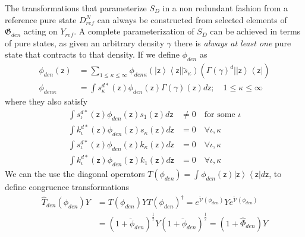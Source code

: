 \documentclass[aps,preprint]{revtex4}%
\begin{document}
The transformations that parameterize $S_{D}$ in a non redundant fashion from
a reference pure state $D_{ref}^{N}$ can always be constructed from selected
elements of $\mathfrak{G}_{den}$ acting on $Y_{ref}$. A complete
parameterization of $S_{D}$ can be achieved in terms of pure states, as given
an arbitrary density $\gamma$ there is \emph{always at least one} pure state
that contracts to that density. If we define $\phi_{den}$ as
\begin{align}
\phi_{den}\left(  \mathsf{z}\right)   &  =\sum_{1\leq\kappa\leq\infty}%
\phi_{den\kappa}\left(  \left|  \mathsf{z}\right\rangle \left\langle
\mathsf{z}\right|  |\breve{s}_{\kappa}\right)  \left(  \Gamma\left(
\gamma\right)  ^{d}|\left|  \mathsf{z}\right\rangle \left\langle
\mathsf{z}\right|  \right) \nonumber\\
\phi_{den\kappa}  &  =\int s_{\kappa}^{d\ast}\left(  \mathsf{z}\right)
\phi_{den}\left(  \mathsf{z}\right)  \Gamma\left(  \gamma\right)  \left(
\mathsf{z}\right)  d\mathsf{z};\quad1\leq\kappa\leq\infty
\end{align}
where they also satisfy
\begin{align}
\int s_{\iota}^{d\ast}\left(  \mathsf{z}\right)  \phi_{den}\left(
\mathsf{z}\right)  s_{1}\left(  \mathsf{z}\right)  d\mathsf{z}  &  \neq
0\quad\text{for some }\iota\nonumber\\
\int k_{\iota}^{d\ast}\left(  \mathsf{z}\right)  \phi_{den}\left(
\mathsf{z}\right)  s_{\kappa}\left(  \mathsf{z}\right)  d\mathsf{z}  &
=0\quad\forall\iota,\kappa\nonumber\\
\int s_{\iota}^{d\ast}\left(  \mathsf{z}\right)  \phi_{den}\left(
\mathsf{z}\right)  k_{\kappa}\left(  \mathsf{z}\right)  d\mathsf{z}  &
=0\quad\forall\iota,\kappa\nonumber\\
\int k_{\iota}^{d\ast}\left(  \mathsf{z}\right)  \phi_{den}\left(
\mathsf{z}\right)  k_{1}\left(  \mathsf{z}\right)  d\mathsf{z}  &
=0\quad\forall\iota,\kappa
\end{align}
We can the use the diagonal operators $T\left(  \phi_{den}\right)  =\int
\phi_{den}\left(  \mathsf{z}\right)  \left|  \mathsf{z}\right\rangle
\left\langle \mathsf{z}\right|  d\mathsf{z}$, to define congruence
transformations%
\begin{align}
\hat{T}_{den}\left(  \phi_{den}\right)  Y  &  =T\left(  \phi_{den}\right)
YT\left(  \phi_{den}\right)  ^{\dagger}=e^{\mathcal{\breve{V}}\left(
\phi_{den}\right)  }Ye^{\mathcal{\breve{V}}\left(  \phi_{den}\right)
}\nonumber\\
&  =\left(  1+\breve{\phi}_{den}\right)  ^{\frac{1}{2}}Y\left(  1+\breve{\phi
}_{den}\right)  ^{\frac{1}{2}}=\left(  1+\hat{\Phi}_{den}\right)  Y
\end{align}
\end{document}

